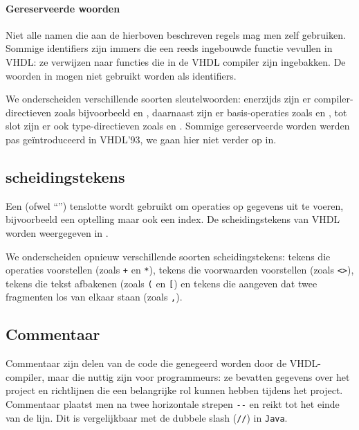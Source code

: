 \paragraph{Gereserveerde woorden}Niet alle namen die aan de hierboven beschreven regels mag men zelf gebruiken. Sommige identifiers zijn immers  die een reeds ingebouwde functie vevullen in VHDL: ze verwijzen naar functies die in de VHDL compiler zijn ingebakken. De woorden in  mogen niet gebruikt worden als identifiers.


We onderscheiden verschillende soorten sleutelwoorden: enerzijds zijn er compiler-directieven zoals bijvoorbeeld  en , daarnaast zijn er basis-operaties zoals  en , tot slot zijn er ook type-directieven zoals  en . Sommige gereserveerde worden werden pas ge\"introduceerd in VHDL'93, we gaan hier niet verder op in.

\subsection{scheidingstekens}
Een  (ofwel ``'') tenslotte wordt gebruikt om operaties op gegevens uit te voeren, bijvoorbeeld een optelling maar ook een index. De
scheidingstekens van VHDL worden weergegeven in .


We onderscheiden opnieuw verschillende soorten scheidingstekens: tekens die operaties voorstellen (zoals \texttt{+} en \texttt{*}), tekens die voorwaarden voorstellen (zoals \texttt{<>}), tekens die tekst afbakenen (zoals \texttt{(} en \texttt{[}) en tekens die aangeven dat twee fragmenten los van elkaar staan (zoals \texttt{,}).

\subsection{Commentaar}
Commentaar zijn delen van de code die genegeerd worden door de VHDL-compiler, maar die nuttig zijn voor programmeurs: ze bevatten gegevens over het project en richtlijnen die een belangrijke rol kunnen hebben tijdens het project. Commentaar plaatst men na twee horizontale strepen \verb+--+ en reikt tot het einde van de lijn. Dit is vergelijkbaar met de dubbele slash (\verb+//+) in \texttt{Java}.

